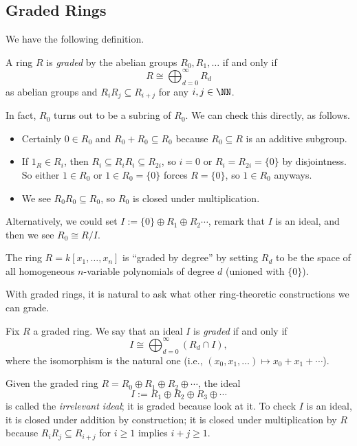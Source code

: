 \subsection{Graded Rings}
We have the following definition.
\begin{definition}
	A ring $R$ is \textit{graded} by the abelian groups $R_0,R_1,\ldots$ if and only if
	\[R\cong\bigoplus_{d=0}^\infty R_d\]
	as abelian groups and $R_iR_j\subseteq R_{i+j}$ for any $i,j\in\NN$.
\end{definition}
\begin{remark}[Nir]
	In fact, $R_0$ turns out to be a subring of $R_0$. We can check this directly, as follows.
	\begin{itemize}
		\item Certainly $0\in R_0$ and $R_0+R_0\subseteq R_0$ because $R_0\subseteq R$ is an additive subgroup.
		\item If $1_R\in R_i$, then $R_i\subseteq R_iR_i\subseteq R_{2i}$, so $i=0$ or $R_i=R_{2i}=\{0\}$ by disjointness. So either $1\in R_0$ or $1\in R_0=\{0\}$ forces $R=\{0\}$, so $1\in R_0$ anyways.
		\item We see $R_0R_0\subseteq R_0$, so $R_0$ is closed under multiplication.
	\end{itemize}
	Alternatively, we could set $I:=\{0\}\oplus R_1\oplus R_2\cdots$, remark that $I$ is an ideal, and then we see $R_0\cong R/I$.
\end{remark}
\begin{example}
	The ring $R=k[x_1,\ldots,x_n]$ is ``graded by degree'' by setting $R_d$ to be the space of all homogeneous $n$-variable polynomials of degree $d$ (unioned with $\{0\}$).
\end{example}
With graded rings, it is natural to ask what other ring-theoretic constructions we can grade.
\begin{definition}
	Fix $R$ a graded ring. We say that an ideal $I$ is \textit{graded} if and only if
	\[I\cong\bigoplus_{d=0}^\infty(R_d\cap I),\]
	where the isomorphism is the natural one (i.e., $(x_0,x_1,\ldots)\mapsto x_0+x_1+\cdots$).
\end{definition}
\begin{example}
	Given the graded ring $R=R_0\oplus R_1\oplus R_2\oplus\cdots$, the ideal
	\[I:=R_1\oplus R_2\oplus R_3\oplus\cdots\]
	is called the \textit{irrelevant ideal}; it is graded because look at it. To check $I$ is an ideal, it is closed under addition by construction; it is closed under multiplication by $R$ because $R_iR_j\subseteq R_{i+j}$ for $i\ge1$ implies $i+j\ge1$.
\end{example}
